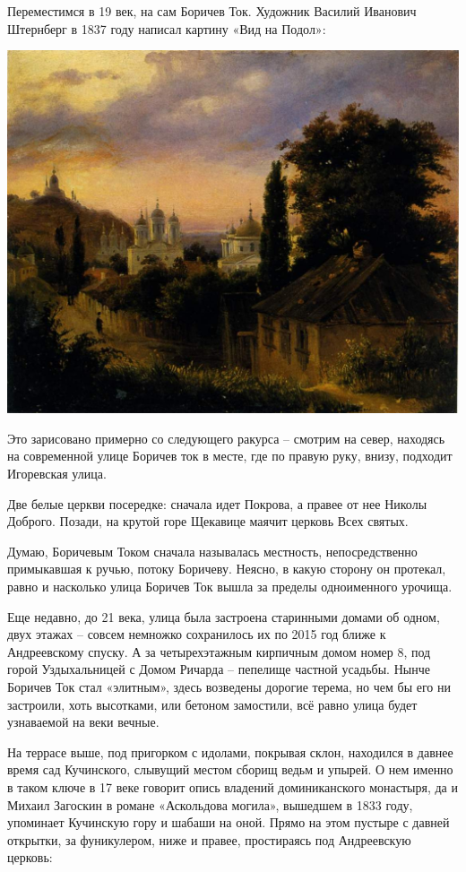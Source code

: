 Переместимся в 19 век, на сам Боричев Ток. Художник Василий Иванович Штернберг в 1837 году написал картину «Вид на Подол»:

\begin{center}
\includegraphics[width=\linewidth]{chast-colebanie-osnov/borichev-tok/st-1837.jpg}
\end{center}

Это зарисовано примерно со следующего ракурса – смотрим на север, находясь на современной улице Боричев ток в месте, где по правую руку, внизу, подходит Игоревская улица.

Две белые церкви посередке: сначала идет Покрова, а правее от нее Николы Доброго. Позади, на крутой горе Щекавице маячит церковь Всех святых.

Думаю, Боричевым Током сначала называлась местность, непосредственно примыкавшая к ручью, потоку Боричеву. Неясно, в какую сторону он протекал, равно и насколько улица Боричев Ток вышла за пределы одноименного урочища.

Еще недавно, до 21 века, улица была застроена старинными домами об одном, двух этажах – совсем немножко сохранилось их по 2015 год ближе к Андреевскому спуску. А за четырехэтажным кирпичным домом номер 8, под горой Уздыхальницей с Домом Ричарда – пепелище частной усадьбы. Нынче Боричев Ток стал «элитным», здесь возведены дорогие терема, но чем бы его ни застроили, хоть высотками, или бетоном замостили, всё равно улица будет узнаваемой на веки вечные.

На террасе выше, под пригорком с идолами, покрывая склон, находился в давнее время сад Кучинского, слывущий местом сборищ ведьм и упырей. О нем именно в таком ключе в 17 веке говорит опись владений доминиканского монастыря, да и Михаил Загоскин в романе «Аскольдова могила», вышедшем в 1833 году, упоминает Кучинскую гору и шабаши на оной. Прямо на этом пустыре с давней открытки, за фуникулером, ниже и правее, простираясь под Андреевскую церковь:

